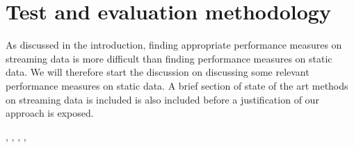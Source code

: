 \section{Test and evaluation methodology}
\label{sec:methodology}

As discussed in the introduction, finding appropriate performance measures on streaming data is more difficult than finding performance measures on static data.  We will therefore start the discussion on discussing some relevant performance measures on static data.  A brief section of state of the art methods on streaming data is included is also included before a justification of our approach is exposed.  



%
%
\cite{Kap14}, \cite{Gam09}, \cite{Gam09_2}, \cite{Gam12}, 
